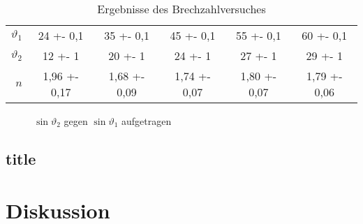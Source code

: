 \begin{table}[H]
\centering
{}
\begin{tabular}{r|SSSSS}
$ \vartheta_1 $ & 24 +- 0,1 & 35 +- 0,1 & 45 +- 0,1 & 55 +- 0,1 & 60 +- 0,1 \\
$ \vartheta_2 $ & 12 +- 1 & 20 +- 1 & 24 +- 1 & 27 +- 1 & 29 +- 1 \\
$ n $ & 1,96 +- 0,17 & 1,68 +- 0,09 & 1,74 +- 0,07 & 1,80 +- 0,07 & 1,79 +- 0,06
\end{tabular}
\caption{Ergebnisse des Brechzahlversuches}
\label{tab:n}
\end{table}

\begin{figure}[H]
\centering

\caption{$ \sin\vartheta_2 $ gegen $ \sin\vartheta_1 $ aufgetragen}
\label{fig:n}
\end{figure}
\subsection{title}
\newpage
\section{Diskussion} 
